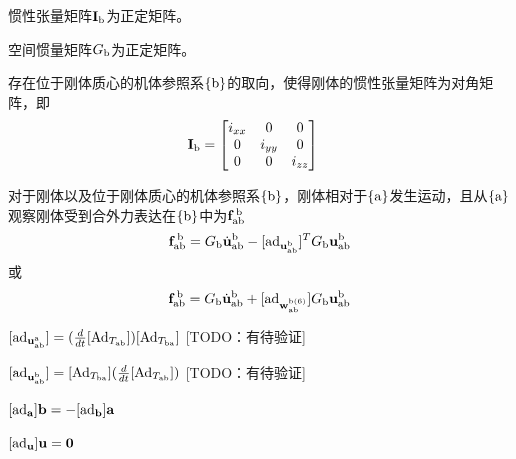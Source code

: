 \documentclass[12pt, a4paper, article, UTF8]{ctexart}
\begin{document}
\begin{mytheorem}
惯性张量矩阵$\mathbf{I}_\textnormal{b}$为正定矩阵。
\end{mytheorem}


\begin{mytheorem}
空间惯量矩阵$G_\textnormal{b}$为正定矩阵。
\end{mytheorem}

\begin{mytheorem}
存在位于刚体质心的机体参照系$\{\textnormal{b}\}$的取向，使得刚体的惯性张量矩阵为对角矩阵，即
\begin{align*}
\mathbf{I}_\textnormal{b} 
&= \begin{bmatrix}
i_{xx} & 0 & 0\\
0 & i_{yy} & 0\\
0 & 0 & i_{zz}
\end{bmatrix}
\end{align*}
\end{mytheorem}

\begin{mytheorem}
对于刚体以及位于刚体质心的机体参照系$\{\textnormal{b}\}$，刚体相对于$\{\textnormal{a}\}$发生运动，且从$\{\textnormal{a}\}$观察刚体受到合外力表达在$\{\textnormal{b}\}$中为$\mathbf{f}_\textnormal{ab}^{\,\textnormal{b}}$
\begin{align*}
\mathbf{f}_\textnormal{ab}^{\,\textnormal{b}} = G_\textnormal{b} \dot{\mathbf{u}}_\textnormal{ab}^\textnormal{b} - [\textnormal{ad}_{\mathbf{u}_\textnormal{ab}^\textnormal{b}}]^T G_\textnormal{b} \mathbf{u}_\textnormal{ab}^\textnormal{b}
\end{align*}
或
\begin{align*}
\mathbf{f}_\textnormal{ab}^{\,\textnormal{b}} =  G_\textnormal{b} \dot{\mathbf{u}}_\textnormal{ab}^\textnormal{b} + [\textnormal{ad}_{\mathbf{w}_\textnormal{ab}^{\textnormal{b}(6)}}] G_\textnormal{b} \mathbf{u}_\textnormal{ab}^\textnormal{b}
\end{align*}
\end{mytheorem}

\begin{mytheorem}
$[\textnormal{ad}_{\mathbf{u}_{\textnormal{ab}}^{\textnormal{a}}}] = (\frac{d}{dt}[\textnormal{Ad}_{T_{\textnormal{ab}}}])[\textnormal{Ad}_{T_{\textnormal{ba}}}]$ \label{th:adjointdiff1} [TODO：有待验证]
\end{mytheorem}

\begin{mytheorem}
$[\textnormal{ad}_{\mathbf{u}_{\textnormal{ab}}^{\textnormal{b}}}] = [\textnormal{Ad}_{T_{\textnormal{ba}}}](\frac{d}{dt}[\textnormal{Ad}_{T_{\textnormal{ab}}}])$ \label{th:adjointdiff2} [TODO：有待验证]
\end{mytheorem}

\begin{mytheorem}
$[\textnormal{ad}_{\mathbf{a}}] \mathbf{b} = -[\textnormal{ad}_{\mathbf{b}}] \mathbf{a}$ \label{th:adjointab}
\end{mytheorem}

\begin{mytheorem}
$[\textnormal{ad}_{\mathbf{u}}] \mathbf{u} = \mathbf{0}$ \label{th:adjointtwistzero}
\end{mytheorem}
\end{document}
